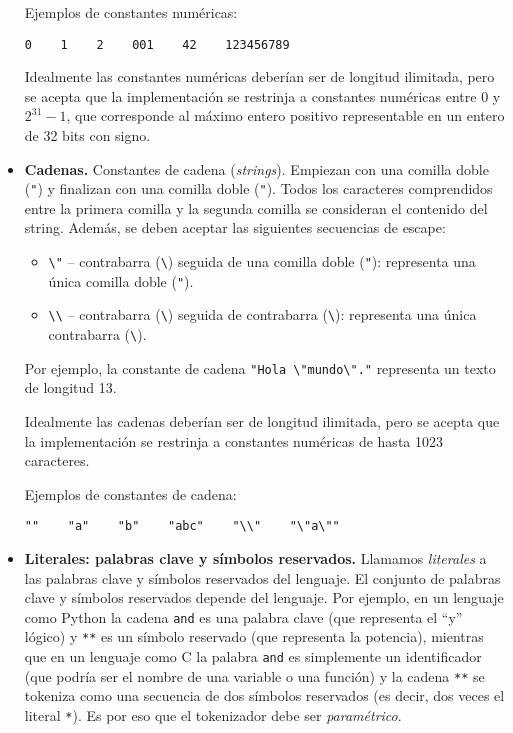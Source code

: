 \documentclass{article}
\begin{document}
\begin{itemize}
      Ejemplos de constantes num\'ericas:
      \begin{center}
      \verb|0    1    2    001    42    123456789|
      \end{center}
      Idealmente las constantes num\'ericas deber\'ian ser de longitud ilimitada, pero se acepta que la implementaci\'on
      se restrinja a constantes num\'ericas entre $0$ y $2^{31} - 1$, que corresponde al m\'aximo entero positivo
      representable en un entero de 32 bits con signo.
\item {\bf Cadenas.}
      Constantes de cadena ({\em strings}).
      Empiezan con una comilla doble (\texttt{"}) y finalizan con una comilla doble (\texttt{"}).
      Todos los caracteres comprendidos entre la primera comilla y la segunda comilla se consideran
      el contenido del string.
      Adem\'as, se deben aceptar las siguientes secuencias de escape:
      \begin{itemize}
      \item \verb|\"| -- contrabarra (\verb|\|) seguida de una comilla doble (\verb|"|): representa una \'unica comilla doble (\verb|"|).
      \item \verb|\\| -- contrabarra (\verb|\|) seguida de contrabarra (\verb|\|): representa una \'unica contrabarra (\verb|\|).
      \end{itemize}
      Por ejemplo, la constante de cadena \verb|"Hola \"mundo\"."| representa un texto de longitud 13.

      Idealmente las cadenas deber\'ian ser de longitud ilimitada, pero se acepta que la implementaci\'on
      se restrinja a constantes num\'ericas de hasta 1023 caracteres.

      Ejemplos de constantes de cadena:
      \begin{center}
      \verb|""    "a"    "b"    "abc"    "\\"    "\"a\""|
      \end{center}

\item {\bf Literales: palabras clave y s\'imbolos reservados.}
      Llamamos {\em literales} a las palabras clave y s\'imbolos reservados del lenguaje.
      El conjunto de palabras clave y s\'imbolos reservados depende del lenguaje.
      Por ejemplo,
      en un lenguaje como Python la cadena \verb|and| es una palabra clave (que representa el ``y'' l\'ogico)
      y \verb|**| es un s\'imbolo reservado (que representa la potencia),
      mientras que en un lenguaje como C la palabra \verb|and| es simplemente un identificador (que podr\'ia
      ser el nombre de una variable o una funci\'on)
      y la cadena \verb|**| se tokeniza como una secuencia de dos s\'imbolos reservados
      (es decir, dos veces el literal \verb|*|).
      Es por eso que el tokenizador debe ser {\em param\'etrico}.


\end{itemize}
\end{document}

